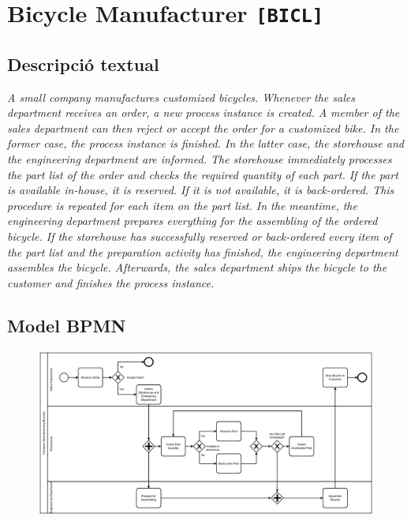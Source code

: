 \clearpage

\section{Bicycle Manufacturer \texttt{[BICL]}}

\subsection*{Descripció textual}

\textit{A small company manufactures customized bicycles. Whenever the sales department receives an order, a new process instance is created. A member of the sales department can then reject or accept the order for a customized bike. In the former case, the process instance is finished. In the latter case, the storehouse and the engineering department are informed. The storehouse immediately processes the part list of the order and checks the required quantity of each part. If the part is available in-house, it is reserved. If it is not available, it is back-ordered. This procedure is repeated for each item on the part list. In the meantime, the engineering department prepares everything for the assembling of the ordered bicycle. If the storehouse has successfully reserved or back-ordered every item of the part list and the preparation activity has finished, the engineering department assembles the bicycle. Afterwards, the sales department ships the bicycle to the customer and finishes the process instance.}

\subsection*{Model BPMN}

\begin{figure}[!h]
    \centering
    \includegraphics[width=\textwidth]{figures/benchmark/Bicycle_Manufacturer.png}
\end{figure}

